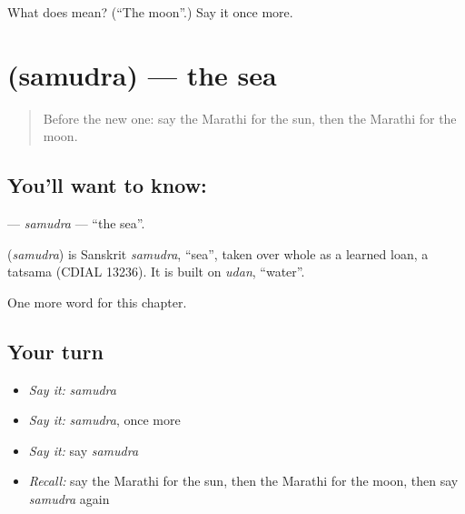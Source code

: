 \begin{tcolorbox}[breakable,colback=teal!4,colframe=teal!35!black,title={Before you move on}]
What does  mean? (\textquotedblleft{}The moon\textquotedblright{}.) Say it once more.
\end{tcolorbox}
\section[\texorpdfstring{\mr{समुद्र} (samudra)}{समुद्र (samudra)}]{ (samudra) — the sea}

\label{lesson:MR-C98-samudra}



\begin{quote}
Before the new one: say the Marathi for the sun, then the Marathi for the moon.
\end{quote}

\subsection*{You'll want to know: }
\textbf{} — \emph{samudra} — \textquotedblleft{}the sea\textquotedblright{}.

\begin{cousinweb}
\textbf{} (\emph{samudra}) is Sanskrit \emph{samudra}, \textquotedblleft{}sea\textquotedblright{}, taken over whole as a learned loan, a tatsama (CDIAL 13236). It is built on \emph{udan}, \textquotedblleft{}water\textquotedblright{}.
\end{cousinweb}

\begin{grammarlens}[title={What you've built}]
One more word for this chapter.
\end{grammarlens}

\subsection*{Your turn}
\begin{itemize}
\raggedright
  \item \emph{Say it:} \emph{samudra}
  \item \emph{Say it:} \emph{samudra}, once more
  \item \emph{Say it:} say \emph{samudra}
  \item \emph{Recall:} say the Marathi for the sun, then the Marathi for the moon, then say \emph{samudra} again
\end{itemize}

